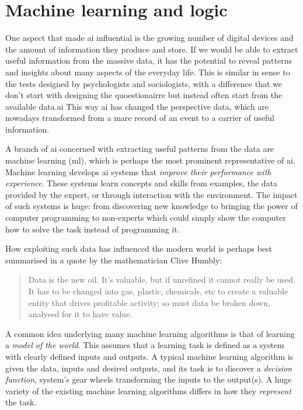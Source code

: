 \section{Machine learning and logic}



One aspect that made \gls{ai} influential is the growing number of digital devices and the amount of information they produce and store.
If we would be able to extract useful information from the massive data, it has the potential to reveal patterns and insights about many aspects of the everyday life.
This is similar in sense to the tests designed by psychologists and sociologists, with a difference that we don't start with designing the quoestionairre but instead  often start from the available data.\gls{ai}
This way \gls{ai} has changed the perspective data, which are nowadays transformed from a mare record of an event to a carrier of useful information.


A branch of \gls{ai} concerned with extracting useful patterns from the data are machine learning (\gls{ml}), which is perhaps the most prominent representative of \gls{ai}.
Machine learning develops \gls{ai} systems that \textit{improve their performance with experience}.
These systems learn concepts and skills from examples, the data provided by the expert, or through interaction with the environment.
The impact of such systems is huge: from discovering new knowledge to bringing the power of computer programming to non-experts which could simply show the computer how to solve the task instead of programming it.



How exploiting such data has influenced the modern world is perhaps best summarised  in a quote by the mathematician Clive Humbly:
\begin{quote}
	Data is the new oil. It’s valuable, but if unrefined it cannot really be used. It has to be changed into gas, plastic, chemicals, etc to create a valuable entity that drives profitable activity; so must data be broken down, analysed for it to have value.
\end{quote}




A common idea underlying many machine learning algorithms is that of learning a \textit{model of the world}. 
This assumes that a learning task is defined as a system with clearly defined inputs and outputs.
A typical machine learning algorithm is given the data, inputs and desired outputs, and its task is to discover a \textit{decision function}, system's gear wheels transforming the inputs to the output(s).
A huge variety of the existing machine learning algorithms differs in how they \textit{represent} the task.



